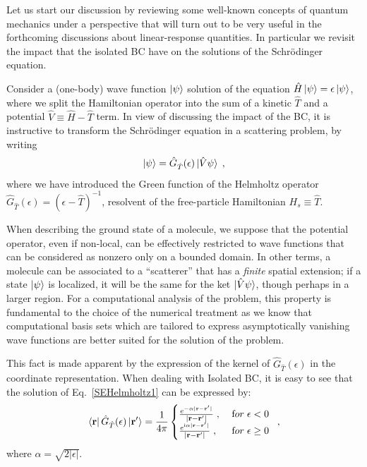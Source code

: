 \documentclass[reprint,aps,prb]{revtex4-1}
\renewcommand{\r}{{\bf r}}
\newcommand{\eps}{\epsilon}
\newcommand{\ii}{\mathrm{i}}
\newcommand{\be}{\begin{equation}}
\newcommand{\ee}{\end{equation}}
\newcommand{\lb}{\label}
\newcommand{\op}[1]{\hat {#1}}
\newcommand{\GH}{\op G_{\op T}}
\begin{document}
Let us start our discussion by reviewing some well-known concepts of quantum mechanics under a perspective that will turn out to be very useful
in the forthcoming discussions about linear-response quantities. In particular we revisit the impact that the isolated BC have on the solutions
of the Schr\"odinger equation.

Consider a (one-body) wave function $\ket{\psi}$ solution of the equation
$\op H\ket{\psi}=\eps\ket{\psi}$, where we split the Hamiltonian operator into the sum of
a kinetic $\op T$ and a potential $\op V \equiv \op H - \op T$ term.
In view of discussing the impact of the BC, it is instructive to transform
the Schr\"odinger equation in a scattering problem, by writing
\be\lb{SEHelmholtz1}
\ket{\psi} = \GH(\eps)\ket{\op V\psi}\;,
\ee
where we have introduced the Green function of the Helmholtz operator $\GH(\eps) = (\eps-\op T)^{-1}$,
resolvent of the free-particle Hamiltonian $H_s \equiv \op T$.

When describing the ground state of a molecule, we suppose that the potential operator, even if non-local,
can be effectively restricted to wave functions that can be considered as nonzero only on a
bounded domain. In other terms, a molecule can be associated to a ``scatterer'' that has a \emph{finite}
spatial extension; if a state $\ket{\psi}$ is localized, it will be the same for the ket $\ket{\op V \psi}$, though
perhaps in a larger region.
For a computational analysis of the problem, this property is fundamental to the choice of the numerical treatment as we know that
computational basis sets
which are tailored to express asymptotically vanishing wave functions are better suited for the solution of the problem.

This fact is made apparent by the expression of
the kernel of $\GH(\eps)$ in the coordinate representation.
When dealing with Isolated BC, it is easy to see that the solution of Eq.~\eqref{SEHelmholtz1}
can be expressed by:
\be\lb{HelmholtzKernelDef1}
\bra{\r} \GH(\eps) \ket{\r'} = \frac{1}{4\pi} \begin{cases}
\frac{e^{-\alpha|\r - \r' |}}{|\r- \r' |} \;,\; & {\textrm for}\; \eps  < 0\; \\
\frac{e^{\ii \alpha |\r-\r' |}}{|\r-\r' |} \;, & {\textrm for} \; \eps \geq 0
\end{cases} \;,
\ee
where $\alpha = \sqrt{2|\eps|}$.
\end{document}
